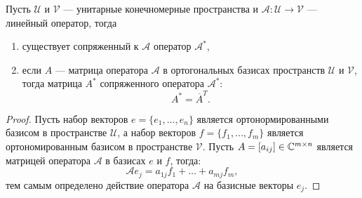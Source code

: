 \begin{statement}
    Пусть $\mathcal{U}$ и $\mathcal{V}$ --- унитарные конечномерные пространства и $\mathcal{A} : \mathcal{U} \rightarrow \mathcal{V}$ --- линейный оператор, тогда
    \begin{enumerate}
        \item существует сопряженный к $\mathcal{A}$ оператор $\mathcal{A}^*$,
        \item если $A$ --- матрица оператора $\mathcal{A}$ в ортогональных базисах пространств $\mathcal{U}$ и $\mathcal{V}$, тогда матрица $A^*$ сопряженного оператора
        $\mathcal{A^*}$:
        \[
            A^* = \overline{A}^T .
        \]
    \end{enumerate}
\end{statement}
\begin{proof}
    Пусть набор векторов $e = \{ e_1, \dots, e_n \}$ является ортонормированными базисом в пространстве $\mathcal{U}$, а набор векторов $f = \{f_1, \dots, f_m \}$
    является ортономированным базисом в пространстве $\mathcal{V}$. Пусть $A = [a_{ij}] \in \mathbb{C}^{m \times n}$ является матрицей оператора $\mathcal{A}$ в базисах
    $e$ и $f$, тогда:
    \[
        \mathcal{A} e_j = a_{1j} f_1 + \dots + a_{mj} f_m,
    \]
    тем самым определено действие оператора $\mathcal{A}$ на базисные векторы $e_j$.


\end{proof}

